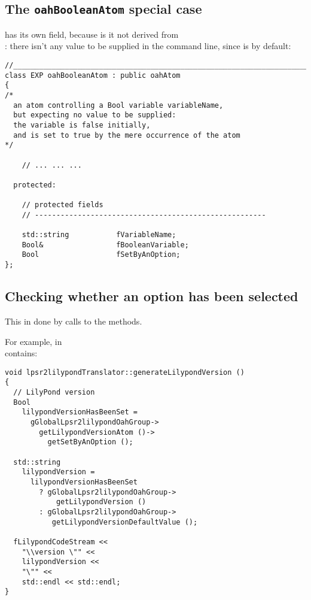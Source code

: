\subsection{The {\tt oahBooleanAtom} special case}

 has its own  field, because is it not derived from\\
: there isn't any value to be supplied in the command line, since  is  by default:
\begin{lstlisting}[language=CPlusPlus]
//______________________________________________________________________________
class EXP oahBooleanAtom : public oahAtom
{
/*
  an atom controlling a Bool variable variableName,
  but expecting no value to be supplied:
  the variable is false initially,
  and is set to true by the mere occurrence of the atom
*/

	// ... ... ...

  protected:

    // protected fields
    // ------------------------------------------------------

    std::string           fVariableName;
    Bool&                 fBooleanVariable;
    Bool                  fSetByAnOption;
};
\end{lstlisting}


\subsection{Checking whether an option has been selected}

This in done by calls to the  methods.

For example,  in \\
 contains:
\begin{lstlisting}[language=CPlusPlus]
void lpsr2lilypondTranslator::generateLilypondVersion ()
{
  // LilyPond version
  Bool
    lilypondVersionHasBeenSet =
      gGlobalLpsr2lilypondOahGroup->
        getLilypondVersionAtom ()->
          getSetByAnOption ();

  std::string
    lilypondVersion =
      lilypondVersionHasBeenSet
        ? gGlobalLpsr2lilypondOahGroup->
            getLilypondVersion ()
        : gGlobalLpsr2lilypondOahGroup->
           getLilypondVersionDefaultValue ();

  fLilypondCodeStream <<
    "\\version \"" <<
    lilypondVersion <<
    "\"" <<
    std::endl << std::endl;
}
\end{lstlisting}

